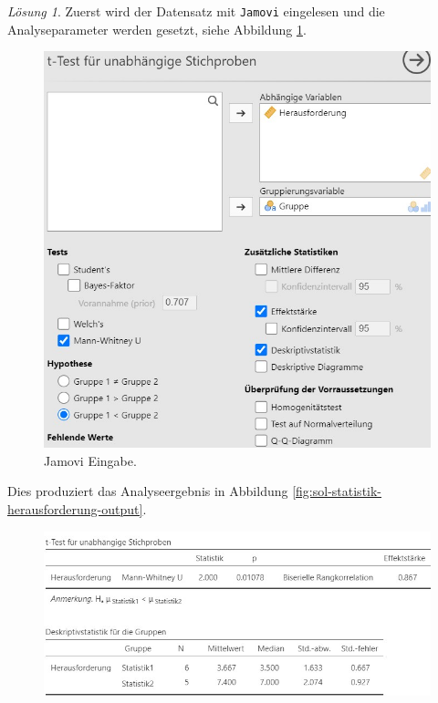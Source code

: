 \documentclass[
]{book}
\theoremstyle{definition}
\theoremstyle{definition}
\theoremstyle{definition}
\theoremstyle{definition}
\theoremstyle{remark}
\newtheorem*{solution}{Lösung}
\begin{document}
\begin{solution}

Zuerst wird der Datensatz mit \texttt{Jamovi} eingelesen und die
Analyseparameter werden gesetzt, siehe Abbildung
\ref{fig:sol-statistik-herausforderung-input}.

\begin{figure}

{\centering \includegraphics[width=1\linewidth]{figures/07-exr-statistik-herausforderung-jmv-input} 

}

\caption{Jamovi Eingabe.}\label{fig:sol-statistik-herausforderung-input}
\end{figure}

Dies produziert das Analyseergebnis in Abbildung
\ref{fig:sol-statistik-herausforderung-output}.

\begin{figure}

{\centering \includegraphics[width=1\linewidth]{figures/07-exr-statistik-herausforderung-jmv-output} 

}
\end{figure}
\end{solution}
\end{document}
